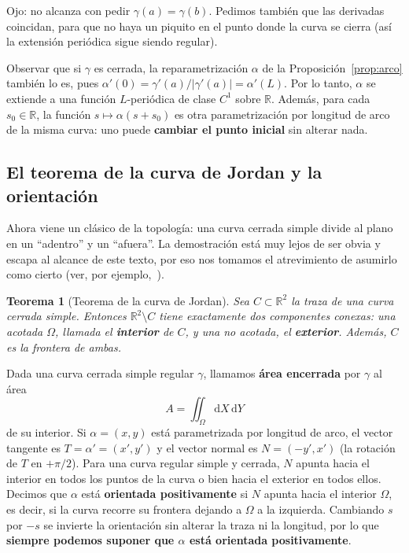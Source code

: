 \documentclass[12pt,a4paper]{article}
\theoremstyle{profesional}
\newtheorem{teorema}{Teorema}[subsection]
\theoremstyle{definicion-style}
\newcommand{\R}{\mathbb{R}}
\newcommand{\abs}[1]{\left| #1 \right|}
\begin{document}
Ojo: no alcanza con pedir \( \gamma(a) = \gamma(b) \). Pedimos también que las derivadas coincidan, para que no haya un piquito en el punto donde la curva se cierra (así la extensión periódica sigue siendo regular).

Observar que si \( \gamma \) es cerrada, la reparametrización \( \alpha \) de la Proposición~\ref{prop:arco} también lo es, pues \( \alpha'(0) = \gamma'(a)/\abs{\gamma'(a)} = \alpha'(L) \). Por lo tanto, \( \alpha \) se extiende a una función
\( L \)-periódica de clase \( C^1 \) sobre \( \R \). Además, para cada \( s_0 \in \R \), la función \( s \mapsto \alpha(s + s_0) \) es otra parametrización por longitud de arco de la misma curva: uno puede \textbf{cambiar el punto inicial} sin alterar nada.

\subsection{El teorema de la curva de Jordan y la orientación}

Ahora viene un clásico de la topología: una curva cerrada simple divide al plano en un ``adentro'' y un ``afuera''. La demostración está muy lejos de ser obvia y escapa al alcance de este texto, por eso nos tomamos el atrevimiento de asumirlo como cierto (ver, por ejemplo,~\cite{docarmo}).

\begin{teorema}[Teorema de la curva de Jordan]
    Sea \( C \subset \R^2 \) la traza de una curva cerrada simple. Entonces \( \R^2 \setminus C \) tiene exactamente dos componentes conexas: una acotada \( \Omega \), llamada el \textbf{interior} de \( C \),
    y una no acotada, el \textbf{exterior}. Además, \( C \) es la frontera de ambas.
\end{teorema}

Dada una curva cerrada simple regular \( \gamma \), llamamos \textbf{área encerrada} por \( \gamma \) al área
\[
    A = \iint_{\Omega} \mathrm{d}X \, \mathrm{d}Y
\]
de su interior. Si \( \alpha = (x, y) \) está parametrizada por longitud de arco, el vector tangente es \( T = \alpha' = (x', y') \) y el vector normal es \( N = (-y', x') \) (la rotación de \( T \) en \( +\pi/2 \)).
Para una curva regular simple y cerrada, \( N \) apunta hacia el interior en todos los puntos de la curva o bien hacia el exterior en todos ellos.
Decimos que \( \alpha \) está \textbf{orientada positivamente} si \( N \) apunta hacia el interior \( \Omega \), es decir, si la curva recorre su frontera dejando a \( \Omega \) a la izquierda.
Cambiando \( s \) por \( -s \) se invierte la orientación sin alterar la traza ni la longitud, por lo que \textbf{siempre podemos suponer que \( \alpha \) está orientada positivamente}.
\end{document}
